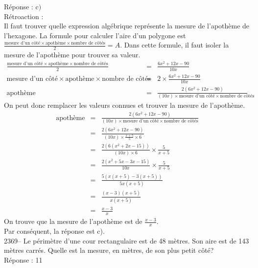 \documentclass[letterpaper, 12pt]{article}
\begin{document}
R\'eponse : c$)$\\

R\'etroaction :\\
Il faut trouver quelle expression alg\'ebrique repr\'esente la mesure de l'apoth\`eme de l'hexagone. La formule pour calculer l'aire d'un polygone est $\frac{\textrm{mesure d'un c\^ot\'e}\times\textrm{apoth\`eme}\times\textrm{nombre de c\^ot\'es}}{2}=A$. Dans cette formule, il faut isoler la mesure de l'apoth\`eme pour trouver sa valeur.
\begin{eqnarray*}
\frac{\textrm{mesure d'un c\^ot\'e}\times\textrm{apoth\`eme}\times\textrm{nombre de c\^ot\'es}}{2}&=&\frac{6x^{2}+12x-90}{10x}\\[2mm]
\textrm{mesure d'un c\^ot\'e}\times\textrm{apoth\`eme}\times\textrm{nombre de c\^ot\'es}&=&2\times \frac{6x^{2}+12x-90}{10x}\\[2mm]
\textrm{apoth\`eme}&=&\frac{2(6x^{2}+12x-90)}{(10x)\times\textrm{mesure d'un c\^ot\'e}\times\textrm{nombre de c\^ot\'es}}
\end{eqnarray*}
On peut donc remplacer les valeurs connues et trouver la mesure de l'apoth\`eme.
\begin{eqnarray*}
\textrm{apoth\`eme}&=&\frac{2(6x^{2}+12x-90)}{(10x)\times\textrm{mesure d'un c\^ot\'e}\times\textrm{nombre de c\^ot\'es}}\\[2mm]
&=&\frac{2(6x^{2}+12x-90)}{(10x)\times\frac{x+5}{5}\times6}\\[2mm]
&=&\frac{2(6(x^{2}+2x-15))}{(10x)\times6}\times\frac{5}{x+5}\\[2mm]
&=&\frac{2(x^{2}+5x-3x-15)}{10x}\times\frac{5}{x+5}\\[2mm]
&=&\frac{5(x(x+5)-3(x+5))}{5x(x+5)}\\[2mm]
&=&\frac{(x-3)(x+5)}{x(x+5)}\\[2mm]
&=&\frac{x-3}{x}
\end{eqnarray*}
On trouve que la mesure de l'apoth\`eme est de $\frac{x-3}{x}$.\\
Par cons\'equent, la r\'eponse est c).\\

2369-- Le p\'erim\`etre d'une cour rectangulaire est de 48 m\`etres. Son aire est de 143 m\`etres carr\'es. Quelle est la mesure, en m\`etres, de son plus petit c\^ot\'e?\\

R\'eponse : 11\\
\end{document}
